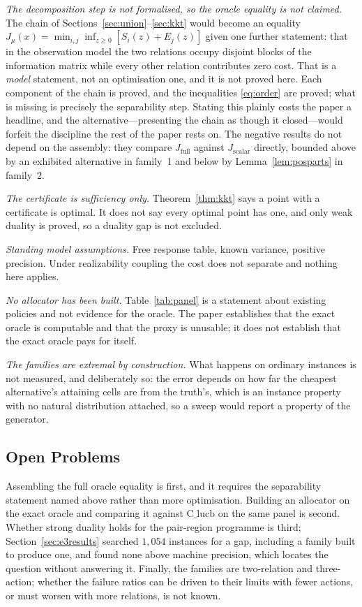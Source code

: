 \documentclass[conference]{IEEEtran}
\theoremstyle{definition}
\begin{document}
\emph{The decomposition step is not formalised, so the oracle equality is not claimed.} The
chain of Sections~\ref{sec:union}--\ref{sec:kkt} would become an equality
$J_{\mu}(x)=\min_{i,j}\inf_{z\ge0}[S_{i}(z)+E_{j}(z)]$ given one further statement: that in
the observation model the two relations occupy disjoint blocks of the information matrix
while every other relation contributes zero cost. That is a \emph{model} statement, not an
optimisation one, and it is not proved here. Each component of the chain is proved, and the
inequalities \eqref{eq:order} are proved; what is missing is precisely the separability step.
Stating this plainly costs the paper a headline, and the alternative---presenting the chain as
though it closed---would forfeit the discipline the rest of the paper rests on. The negative
results do not depend on the assembly: they compare $J_{\mathrm{full}}$ against
$J_{\mathrm{scalar}}$ directly, bounded above by an exhibited alternative in family~1 and
below by Lemma~\ref{lem:posparts} in family~2.

\emph{The certificate is sufficiency only.} Theorem~\ref{thm:kkt} says a point with a
certificate is optimal. It does not say every optimal point has one, and only weak duality is
proved, so a duality gap is not excluded.

\emph{Standing model assumptions.} Free response table, known variance, positive precision.
Under realizability coupling the cost does not separate and nothing here applies.

\emph{No allocator has been built.} Table~\ref{tab:panel} is a statement about existing
policies and not evidence for the oracle. The paper establishes that the exact oracle is
computable and that the proxy is unusable; it does not establish that the exact oracle pays
for itself.

\emph{The families are extremal by construction.} What happens on ordinary instances is not
measured, and deliberately so: the error depends on how far the cheapest alternative's
attaining cells are from the truth's, which is an instance property with no natural
distribution attached, so a sweep would report a property of the generator.

\subsection{Open Problems}

Assembling the full oracle equality is first, and it requires the separability statement named
above rather than more optimisation. Building an allocator on the exact oracle and comparing
it against $\mathrm{C\_lucb}$ on the same panel is second. Whether strong duality holds for
the pair-region programme is third; Section~\ref{sec:e3results} searched $1{,}054$ instances
for a gap, including a family built to produce one, and found none above machine precision,
which locates the question without answering it. Finally, the families are two-relation and three-action;
whether the failure ratios can be driven to their limits with fewer actions, or must worsen
with more relations, is not known.
\end{document}
